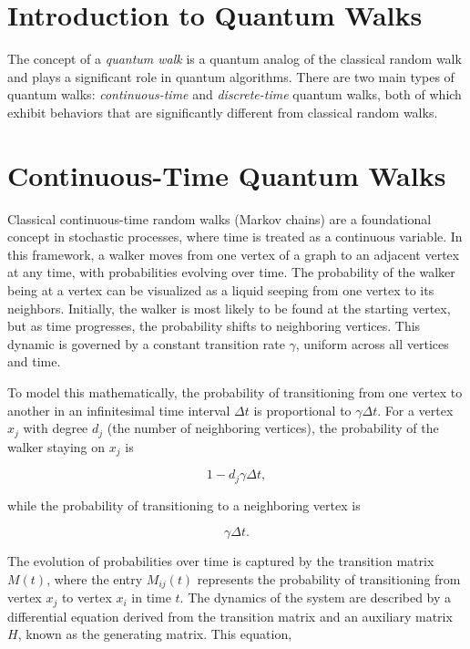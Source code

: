 \documentclass[11pt]{article}
\theoremstyle{definition}
\begin{document}
\section{Introduction to Quantum Walks}


The concept of a \textit{quantum walk} is a quantum analog of the classical random walk and plays a significant role in quantum algorithms. There are two main types of quantum walks: \textit{continuous-time} and \textit{discrete-time} quantum walks, both of which exhibit behaviors that are significantly different from classical random walks.


\section*{Continuous-Time Quantum Walks}


Classical continuous-time random walks (Markov chains) are a foundational concept in stochastic processes, where time is treated as a continuous variable. In this framework, a walker moves from one vertex of a graph to an adjacent vertex at any time, with probabilities evolving over time. The probability of the walker being at a vertex can be visualized as a liquid seeping from one vertex to its neighbors. Initially, the walker is most likely to be found at the starting vertex, but as time progresses, the probability shifts to neighboring vertices. This dynamic is governed by a constant transition rate \( \gamma \), uniform across all vertices and time.

To model this mathematically, the probability of transitioning from one vertex to another in an infinitesimal time interval \( \Delta t \) is proportional to \( \gamma \Delta t \). For a vertex \( x_j \) with degree \( d_j \) (the number of neighboring vertices), the probability of the walker staying on \( x_j \) is 

\[
1 - d_j \gamma \Delta t,
\]

while the probability of transitioning to a neighboring vertex is 

\[
\gamma \Delta t.
\]

The evolution of probabilities over time is captured by the transition matrix \( M(t) \), where the entry \( M_{ij}(t) \) represents the probability of transitioning from vertex \( x_j \) to vertex \( x_i \) in time \( t \). The dynamics of the system are described by a differential equation derived from the transition matrix and an auxiliary matrix \( H \), known as the generating matrix. This equation, 
\end{document}
